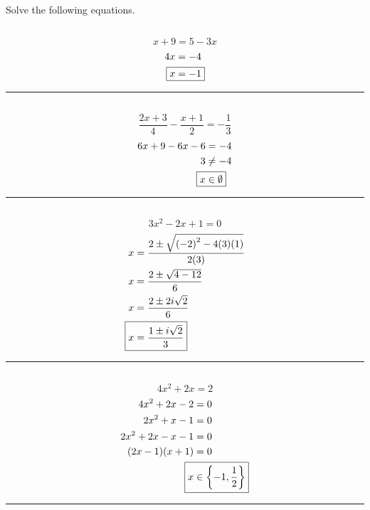 


\section{}
	Solve the following equations.

	\subsection{}
		\[x + 9 = 5 - 3x\]
		\begin{align*}
			4x &= -4 \\
			\Aboxed{x &= -1}
		\end{align*}
		\hrule{}

	\subsection{}
		\[\frac{2x + 3}{4} - \frac{x + 1}{2} = -\frac{1}{3}\]
		\begin{align*}
			6x + 9 - 6x - 6 &= -4 \\
			3 &\neq -4 \\
			\Aboxed{x &\in \emptyset}
		\end{align*}
		\hrule{}

	\subsection{}
		\[3x^2 - 2x + 1 = 0\]
		\begin{align*}
			x &= \frac{2 \pm \sqrt{{(-2)}^2 - 4(3)(1)}}{2(3)} \\
			x &= \frac{2 \pm \sqrt{4 - 12}}{6} \\
			x &= \frac{2 \pm 2i\sqrt{2}}{6} \\
			\Aboxed{x &= \frac{1 \pm i\sqrt{2}}{3}}
		\end{align*}
		\hrule{}

	\subsection{}
		\[4x^2 + 2x = 2\]
		\begin{align*}
			4x^2 + 2x - 2 &= 0 \\
			2x^2 + x - 1 &= 0 \\
			2x^2 + 2x - x - 1 &= 0 \\
			(2x - 1)(x + 1) &= 0 \\
			\Aboxed{x &\in \left\{-1, \frac{1}{2}\right\}}
		\end{align*}
		\hrule{}

